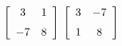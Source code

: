{$\left[ \begin {array}{cc} 3&1\\\noalign{\medskip}-7&8\end {array}
 \right] $}
{$\left[ \begin {array}{cc} 3&-7\\\noalign{\medskip}1&8\end {array}
 \right] $
}



